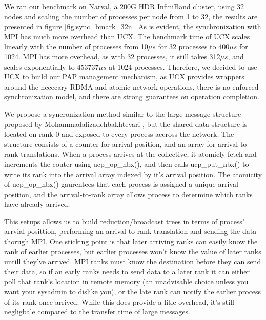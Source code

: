 We ran our benchmark on Narval, a 200G HDR InfiniBand cluster, using 32 nodes and scaling the number of processes per node from 1 to 32, the results are presented in figure \ref{fig:sync_bmark_32n}.
As is evident, the synchronization with MPI has much more overhead than UCX.
The benchmark time of UCX scales linearly with the number of processes from 10$\mu s$ for 32 processes to 400$\mu s$ for 1024.
MPI has more overhead, as with 32 processes, it still takes 312$\mu s$, and scales exponentially to 453737$\mu s$ at 1024 processes.
Therefore, we decided to use UCX to build our PAP management mechanism, as UCX provides wrappers around the nececary RDMA and atomic network operations, there is no enforced synchronization model, and there are strong guarantees on operation completion. 


% 

% 



We propose a syncronization method similar to the large-message structure proposed by Mohammadalizadehbakhtevari \cite{Mohammadalizadehbakhtevari2021Thesis}, but the shared data structure is located on rank 0 and exposed to every process accross the network.
The structure consists of a counter for arrival position, and an array for arrival-to-rank translations.
When a process arrives at the collective, it atomicly fetch-and-increments the couter using ucp\_op\_nbx(), and then calls ucp\_put\_nbx() to write its rank into the arrival array indexed by it's arrival position.
The atomicity of ucp\_op\_nbx() gaurentees that each process is assigned a unique arrival position, and the arrival-to-rank array allows process to determine which ranks have already arrived.

This setups allows us to build reduction/broadcast trees in terms of process' arrvial posittion, performing an arrival-to-rank translation and sending the data thorugh MPI.
One sticking point is that later arriving ranks can easily know the rank of earlier processes, but earlier processes won't know the value of later ranks untill they've arrived.
MPI ranks must know the destination before they can send their data, so if an early ranks needs to send data to a later rank it can either poll that rank's location in remote memory (an unadvisable choice unless you want your sysadmin to dislike you), or the late rank can notify the earlier process of its rank once arrived.
While this does provide a litle overhead, it's still negligbale compared to the transfer time of large messages.

